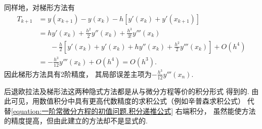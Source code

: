 同样地，对梯形方法有\begin{align*}
	T_{k+1}
	&= y(x_{k+1})
	- y(x_k)
	- h [y'(x_k) + y'(x_{k+1})] \\
	&= h y'(x_k)
	+ \frac{h^2}{2} y''(x_k)
	+ \frac{h^3}{3!} y'''(x_k) \\
	&\hspace{20pt}
	- \frac{h}{2}
	\left[
		y'(x_k)
		+ y'(x_k)
		+ h y''(x_k)
		+ \frac{h^2}{2} y'''(x_k)
	\right]
	+ O(h^4) \\
	&= -\frac{h^3}{12} y'''(x_k)
	+ O(h^4)
	= O(h^3).
\end{align*}
因此梯形方法具有2阶精度，
其局部误差主项为\(-\frac{h^3}{12} y'''(x_n)\).

后退欧拉法及梯形法这两种隐式方法都是从与微分方程等价的积分形式  得到的.
由此可见，用数值积分中具有更高代数精度的求积公式（例如辛普森求积公式）
代替\cref{equation:一阶常微分方程的初值问题.积分递推公式} 右端积分，
虽然能使方法的精度提高，但由此建立的方法却不是显式的.
